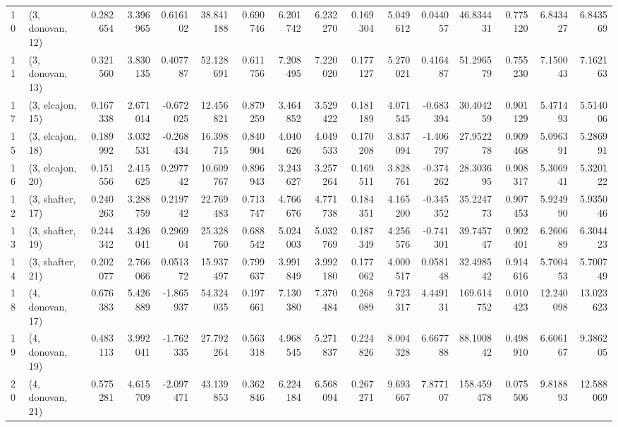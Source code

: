 \begin{tabular}{llrrrrrrrrrrrrrr}
10 &  (3, donovan, 12) &   0.282654 &  3.396965 &  0.616102 &  38.841188 &  0.690746 &   6.201742 &  6.232270 &  0.169304 &  5.049612 &  0.044057 &   46.834431 &  0.775120 &   6.843427 &   6.843569 \\
11 &  (3, donovan, 13) &   0.321560 &  3.830135 &  0.407787 &  52.128691 &  0.611756 &   7.208495 &  7.220020 &  0.177127 &  5.270021 &  0.416487 &   51.296579 &  0.755230 &   7.150043 &   7.162163 \\
17 &  (3, elcajon, 15) &   0.167338 &  2.671014 & -0.672025 &  12.456821 &  0.879259 &   3.464852 &  3.529422 &  0.181189 &  4.071545 & -0.683394 &   30.404259 &  0.901129 &   5.471493 &   5.514006 \\
15 &  (3, elcajon, 18) &   0.189992 &  3.032531 & -0.268434 &  16.398715 &  0.840904 &   4.040626 &  4.049533 &  0.170208 &  3.837094 & -1.406797 &   27.952278 &  0.909468 &   5.096391 &   5.286991 \\
16 &  (3, elcajon, 20) &   0.151556 &  2.415625 &  0.297742 &  10.609767 &  0.896943 &   3.243627 &  3.257264 &  0.169511 &  3.828761 & -0.374262 &   28.303695 &  0.908317 &   5.306941 &   5.320122 \\
12 &  (3, shafter, 17) &   0.240263 &  3.288759 &  0.219742 &  22.769483 &  0.713747 &   4.766676 &  4.771738 &  0.184351 &  4.165200 & -0.345352 &   35.224773 &  0.907453 &   5.924990 &   5.935046 \\
13 &  (3, shafter, 19) &   0.244342 &  3.426041 &  0.296904 &  25.328760 &  0.688542 &   5.024003 &  5.032769 &  0.187349 &  4.256576 & -0.741301 &   39.745747 &  0.902401 &   6.260689 &   6.304423 \\
14 &  (3, shafter, 21) &   0.202077 &  2.766066 &  0.051372 &  15.937497 &  0.799637 &   3.991849 &  3.992180 &  0.177062 &  4.000517 &  0.058148 &   32.498542 &  0.914616 &   5.700453 &   5.700749 \\
18 &  (4, donovan, 17) &   0.676383 &  5.426889 & -1.865937 &  54.324035 &  0.197661 &   7.130380 &  7.370484 &  0.268089 &  9.723317 &  4.449131 &  169.614752 &  0.010423 &  12.240098 &  13.023623 \\
19 &  (4, donovan, 19) &   0.483113 &  3.992041 & -1.762335 &  27.792264 &  0.563318 &   4.968545 &  5.271837 &  0.224826 &  8.004328 &  6.667788 &   88.100842 &  0.498910 &   6.606167 &   9.386205 \\
20 &  (4, donovan, 21) &   0.575281 &  4.615709 & -2.097471 &  43.139853 &  0.362846 &   6.224184 &  6.568094 &  0.267271 &  9.693667 &  7.877107 &  158.459478 &  0.075506 &   9.818893 &  12.588069 \\

\end{tabular}
